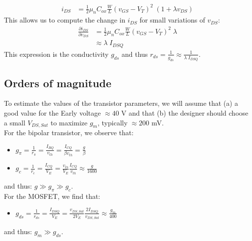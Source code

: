 \begin{equation}
	\begin{split}
		i_{DS} &= \frac{1}{2} \mu_n C_{ox} \frac{W}{L} (v_{GS} - V_T)^2 \; (1 + \lambda v_{DS})
	\end{split}
\end{equation}
This allows us to compute the change in $i_{DS}$ for small variations of $v_{DS}$:
\begin{equation}
	\begin{split}
		\frac{\partial i_{DS}}{\partial v_{DS}} &= \frac{1}{2} \mu_n C_{ox} \frac{W}{L} (v_{GS} - V_T)^2 \; \lambda \\
												&\approx \lambda \; I_{DSQ}
	\end{split}
\end{equation}
This expression is the conductivity $g_{ds}$ and thus $r_{ds} = \frac{1}{g_{ds}} \approx \frac{1}{\lambda \; I_{DSQ}}$.

\subsection{Orders of magnitude}
To estimate the values of the transistor parameters, we will assume that (a) a good value for the Early voltage $\approx 40$ V and that (b) the designer should choose a small $V_{DS,Sat}$ to maximize $g_m$, typically $\approx 200$ mV.\\
For the bipolar transistor, we observe that:
\begin{itemize}
	\item $g_{\pi} = \frac{1}{r_{\pi}}=\frac{I_{BQ}}{v_{th}} = \frac{I_{CQ}}{\beta v_{th}} = \frac{g}{\beta}$
	\item $g_c = \frac{1}{r_c} = \frac{I_{CQ}}{V_E} = \frac{v_{th}}{V_E} \frac{I_{CQ}}{v_{th}} \approx \frac{g}{1600}$
\end{itemize}
and thus: $g \gg g_{\pi} \gg g_c$.\\
For the MOSFET, we find that:
\begin{itemize}
	\item $g_{ds} = \frac{1}{r_{ds}}=\frac{I_{DSQ}}{V_E} = \frac{v_{DS, Sat}}{2 V_E} \frac{2I_{DSQ}}{v_{DS, Sat}} \approx \frac{g_m}{400}$
\end{itemize}
and thus: $g_m \gg g_{ds}$.
